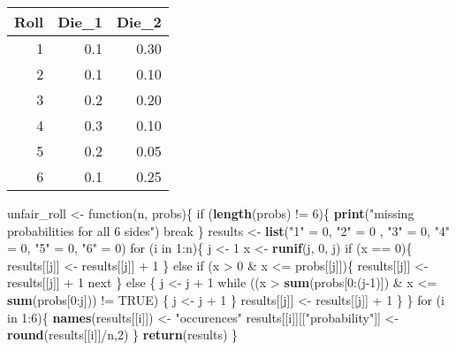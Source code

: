 \documentclass[]{article}
\newenvironment{Shaded}{\begin{snugshade}}{\end{snugshade}}
\newcommand{\KeywordTok}[1]{\textcolor[rgb]{0.13,0.29,0.53}{\textbf{{#1}}}}
\newcommand{\DecValTok}[1]{\textcolor[rgb]{0.00,0.00,0.81}{{#1}}}
\newcommand{\StringTok}[1]{\textcolor[rgb]{0.31,0.60,0.02}{{#1}}}
\newcommand{\OtherTok}[1]{\textcolor[rgb]{0.56,0.35,0.01}{{#1}}}
\newcommand{\NormalTok}[1]{{#1}}
\begin{document}
\begin{longtable}[]{@{}rrr@{}}
\toprule
Roll & Die\_1 & Die\_2\tabularnewline
\midrule
\endhead
1 & 0.1 & 0.30\tabularnewline
2 & 0.1 & 0.10\tabularnewline
3 & 0.2 & 0.20\tabularnewline
4 & 0.3 & 0.10\tabularnewline
5 & 0.2 & 0.05\tabularnewline
6 & 0.1 & 0.25\tabularnewline
\bottomrule
\end{longtable}

\begin{Shaded}
\begin{Highlighting}[]
\NormalTok{unfair_roll <-}\StringTok{ }\NormalTok{function(n, probs)\{}
    \NormalTok{if (}\KeywordTok{length}\NormalTok{(probs) !=}\StringTok{ }\DecValTok{6}\NormalTok{)\{}
      \KeywordTok{print}\NormalTok{(}\StringTok{"missing probabilities for all 6 sides"}\NormalTok{)}
      \NormalTok{break}
    \NormalTok{\}}
    \NormalTok{results <-}\StringTok{ }\KeywordTok{list}\NormalTok{(}\StringTok{"1"} \NormalTok{=}\StringTok{ }\DecValTok{0}\NormalTok{, }\StringTok{"2"} \NormalTok{=}\StringTok{ }\DecValTok{0} \NormalTok{, }\StringTok{"3"} \NormalTok{=}\StringTok{ }\DecValTok{0}\NormalTok{, }\StringTok{"4"} \NormalTok{=}\StringTok{ }\DecValTok{0}\NormalTok{, }\StringTok{"5"} \NormalTok{=}\StringTok{ }\DecValTok{0}\NormalTok{, }\StringTok{"6"} \NormalTok{=}\StringTok{ }\DecValTok{0}\NormalTok{)}
         \NormalTok{for (i in }\DecValTok{1}\NormalTok{:n)\{}
       \NormalTok{j <-}\StringTok{ }\DecValTok{1} 
       \NormalTok{x <-}\StringTok{ }\KeywordTok{runif}\NormalTok{(j, }\DecValTok{0}\NormalTok{, j)}
       \NormalTok{if (x ==}\StringTok{ }\DecValTok{0}\NormalTok{)\{}
        \NormalTok{results[[j]] <-}\StringTok{ }\NormalTok{results[[j]] +}\StringTok{ }\DecValTok{1}
       \NormalTok{\} else if (x >}\StringTok{ }\DecValTok{0} \NormalTok{&}\StringTok{ }\NormalTok{x <=}\StringTok{ }\NormalTok{probs[[j]])\{}
        \NormalTok{results[[j]] <-}\StringTok{ }\NormalTok{results[[j]] +}\StringTok{ }\DecValTok{1}
        \NormalTok{next}
       \NormalTok{\} else \{}
       \NormalTok{j <-}\StringTok{ }\NormalTok{j +}\StringTok{ }\DecValTok{1}
       \NormalTok{while ((x >}\StringTok{ }\KeywordTok{sum}\NormalTok{(probs[}\DecValTok{0}\NormalTok{:(j}\DecValTok{-1}\NormalTok{)]) &}\StringTok{ }\NormalTok{x <=}\StringTok{ }\KeywordTok{sum}\NormalTok{(probs[}\DecValTok{0}\NormalTok{:j])) !=}\StringTok{ }\OtherTok{TRUE}\NormalTok{) \{}
       \NormalTok{j <-}\StringTok{ }\NormalTok{j +}\StringTok{ }\DecValTok{1}
       \NormalTok{\}}
       \NormalTok{results[[j]] <-}\StringTok{ }\NormalTok{results[[j]] +}\StringTok{ }\DecValTok{1}
       \NormalTok{\}}
     \NormalTok{\}}
    \NormalTok{for (i in }\DecValTok{1}\NormalTok{:}\DecValTok{6}\NormalTok{)\{}
     \KeywordTok{names}\NormalTok{(results[[i]]) <-}\StringTok{ "occurences"}
     \NormalTok{results[[i]][[}\StringTok{"probability"}\NormalTok{]] <-}\StringTok{ }\KeywordTok{round}\NormalTok{(results[[i]]/n,}\DecValTok{2}\NormalTok{)}
    \NormalTok{\}}
  \KeywordTok{return}\NormalTok{(results)}
\NormalTok{\}}
\end{Highlighting}
\end{Shaded}
\end{document}
